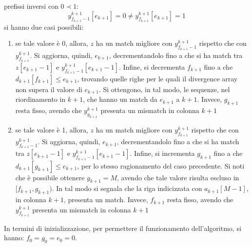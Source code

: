 \begin{enumerate}
  prefissi inversi con $0\prec 1$:
  \begin{equation}
    \label{eq:pbwtsmem4}
    y_{f_{k+1}-1}^{k+1}[e_{k+1}]=0\neq y_{f_{k+1}}^{k+1}[e_{k+1}]=1
  \end{equation}
  si hanno due casi possibili:
  \begin{enumerate}
    \item se tale valore è 0, allora, $z$ ha un match migliore
    con $y_{f_{k+1}-1}^{k+1}$ rispetto che con $y_{f_{k+1}}^{k+1}$. Si aggiorna,
    quindi, $e_{k+1}$, decrementandolo fino a che si ha match tra $z[e_{k+1}-1]$
    e $y_{f_{k+1}-1}^{k+1}[e_{k+1}-1]$. Infine, si decrementa $f_{k+1}$ fino a
    che $d_{k+1}[f_{k+1}]\leq e_{k+1}$, trovando quelle righe per le quali il
    divergence array non supera il valore di $e_{k+1}$. Si ottengono, in
    tal modo, le sequenze, nel riordinamento in $k+1$, che hanno un match da
    $e_{k+1}$ a $k+1$. Invece, $g_{k+1}$ resta fisso, avendo che
    $y_{g_{k+1}}^{k+1}$ presenta un
    mismatch in colonna $k+1$
    \item se tale valore è 1, allora, $z$ ha un match migliore
    con $y_{f_{k+1}}^{k+1}$ rispetto che con $y_{f_{k+1}-1}^{k+1}$. Si aggiorna,
    quindi, $e_{k+1}$, decrementandolo fino a che si ha match tra $z[e_{k+1}-1]$
    e $y_{f_{k+1}-1}^{k+1}[e_{k+1}-1]$. Infine, si incrementa $g_{k+1}$ fino a
    che $d_{k+1}[g_{k+1}]\leq e_{k+1}$, per lo stesso ragionamento del caso
    precedente. Si noti che è possibile ottenere $g_{k+1}=M$, avendo che tale
    valore risulta escluso in $[f_{k+1},g_{k+1})$. In tal modo si segnala che la
    riga indicizzata con $a_{k+1}[M-1]$, in colonna $k+1$, presenta un
    match. Invece, $f_{k+1}$ resta fisso, avendo che $y_{f_{k+1}}^{k+1}$ 
    presenta un mismatch in colonna $k+1$ 
  \end{enumerate}
\end{enumerate}
In termini di inizializzazione, per permettere il funzionamento dell'algoritmo,
si hanno: $f_0=g_0=e_0=0$.

